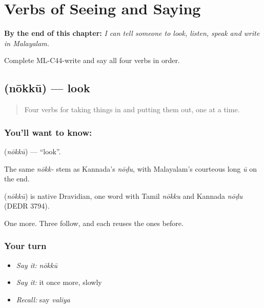 
\chapter{Verbs of Seeing and Saying}
\label{ch:ml-see-say}

\begin{chapteropening}
\textbf{By the end of this chapter:} \emph{I can tell someone to look, listen, speak and write in Malayalam.}

Complete ML-C44-write and say all four verbs in order.
\end{chapteropening}

\section[\texorpdfstring{\ml{നോക്കൂ} (nōkkū)}{നോക്കൂ (nōkkū)}]{ (nōkkū) — look}

\label{lesson:ML-C44-look}



\begin{quote}
Four verbs for taking things in and putting them out, one at a time.
\end{quote}

\subsection*{You'll want to know: }
\textbf{} (\emph{nōkkū}) — \textquotedblleft{}look\textquotedblright{}.

The same \emph{nōkk-} stem as Kannada's \emph{nōḍu}, with Malayalam's courteous long \emph{ū} on the end.

\begin{cousinweb}
\textbf{} (\emph{nōkkū}) is native Dravidian, one word with Tamil \emph{nōkku} and Kannada \emph{nōḍu} (DEDR 3794).
\end{cousinweb}

\begin{grammarlens}[title={What you've built}]
One more. Three follow, and each reuses the ones before.
\end{grammarlens}

\subsection*{Your turn}
\begin{itemize}
\raggedright
  \item \emph{Say it:} \emph{nōkkū}
  \item \emph{Say it:} it once more, slowly
  \item \emph{Recall:} say \emph{valiya}
\end{itemize}

